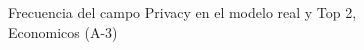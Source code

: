 \begin{figure}[H]
    \centering
    
    \caption{Frecuencia del campo Privacy en el modelo real y Top 2, Economicos (A-3)}
    \label{frecuency-Privacy-top2}
\end{figure}
